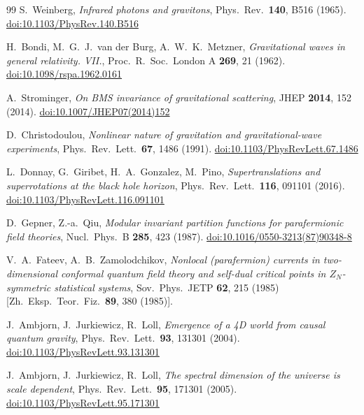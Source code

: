 \documentclass[11pt,a4paper]{article}
\begin{document}
\begin{thebibliography}{99}
  S.~Weinberg,
  \textit{Infrared photons and gravitons},
  Phys.\ Rev.\ \textbf{140}, B516 (1965).
  \href{https://doi.org/10.1103/PhysRev.140.B516}{doi:10.1103/PhysRev.140.B516}

  H.~Bondi, M.~G.~J.~van der Burg, A.~W.~K.~Metzner,
  \textit{Gravitational waves in general relativity. VII.},
  Proc.\ R.\ Soc.\ London A \textbf{269}, 21 (1962).
  \href{https://doi.org/10.1098/rspa.1962.0161}{doi:10.1098/rspa.1962.0161}

  A.~Strominger,
  \textit{On BMS invariance of gravitational scattering},
  JHEP \textbf{2014}, 152 (2014).
  \href{https://doi.org/10.1007/JHEP07(2014)152}{doi:10.1007/JHEP07(2014)152}

  D.~Christodoulou,
  \textit{Nonlinear nature of gravitation and gravitational-wave experiments},
  Phys.\ Rev.\ Lett.\ \textbf{67}, 1486 (1991).
  \href{https://doi.org/10.1103/PhysRevLett.67.1486}{doi:10.1103/PhysRevLett.67.1486}

  L.~Donnay, G.~Giribet, H.~A.~Gonzalez, M.~Pino,
  \textit{Supertranslations and superrotations at the black hole horizon},
  Phys.\ Rev.\ Lett.\ \textbf{116}, 091101 (2016).
  \href{https://doi.org/10.1103/PhysRevLett.116.091101}{doi:10.1103/PhysRevLett.116.091101}

  D.~Gepner, Z.-a.~Qiu,
  \textit{Modular invariant partition functions for parafermionic field theories},
  Nucl.\ Phys.\ B \textbf{285}, 423 (1987).
  \href{https://doi.org/10.1016/0550-3213(87)90348-8}{doi:10.1016/0550-3213(87)90348-8}

  V.~A.~Fateev, A.~B.~Zamolodchikov,
  \textit{Nonlocal (parafermion) currents in two-dimensional conformal quantum field
    theory and self-dual critical points in $Z_N$-symmetric statistical systems},
  Sov.\ Phys.\ JETP \textbf{62}, 215 (1985) [Zh.\ Eksp.\ Teor.\ Fiz.\ \textbf{89}, 380 (1985)].

  J.~Ambjorn, J.~Jurkiewicz, R.~Loll,
  \textit{Emergence of a 4D world from causal quantum gravity},
  Phys.\ Rev.\ Lett.\ \textbf{93}, 131301 (2004).
  \href{https://doi.org/10.1103/PhysRevLett.93.131301}{doi:10.1103/PhysRevLett.93.131301}

  J.~Ambjorn, J.~Jurkiewicz, R.~Loll,
  \textit{The spectral dimension of the universe is scale dependent},
  Phys.\ Rev.\ Lett.\ \textbf{95}, 171301 (2005).
  \href{https://doi.org/10.1103/PhysRevLett.95.171301}{doi:10.1103/PhysRevLett.95.171301}


\end{thebibliography}
\end{document}
